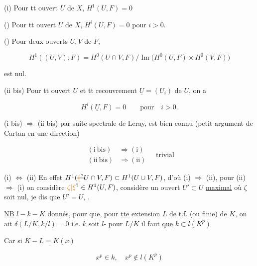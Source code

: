 (i) Pour tt ouvert $U$ de $X$, $H^1(U,F)=0$

() Pour tt ouvert $U$ de $X$, $H^i(U,F)=0$ pour $i>0$.

()  Pour deux ouverts $U,V$ de $F$,

\[
H^1((U,V);F)=H^0(U\cap V,F)/\operatorname{Im}\big(H^0(U,F)\times H^0(V,F)\big)
\]

est nul.

(ii bis) Pour tt ouvert $U$ et tt recouvrement  $\underline{U}=(U_i)$ de $U$, on a

\[
H^i(\underline{U},F)=0\qquad\text{pour}\quad i>0.
\]

(i bis) $\Longrightarrow$ (ii bis) par suite spectrale de Leray, est bien connu (petit argument de Cartan en une direction)

\[
\begin{aligned}
(\mathrm{i\ bis})&\Longrightarrow(\mathrm{i})\\[-2pt]
(\mathrm{ii\ bis})&\Longrightarrow(\mathrm{ii})
\end{aligned}
\quad\text{trivial}
\]

(i) $\Longleftrightarrow$ (ii) En effet $H^1(\deleted{\unsure{\{} }U\cap V,F)\subset H^1(U\cup V,F)$, d'où (i) $\Rightarrow$ (ii), pour (ii) $\Longrightarrow$ (i) on  considère $\unsure{\zeta|\xi}\in H^1(U,F)$,  considère un ouvert $U'\subset U$ \uline{maximal}  où $\zeta$ soit nul, je dis que $U'=U$, .

\uline{NB} $l-k-K$ donnés, pour que, pour \uline{tte} extension $L$ de t.f. (ou finie) de $K$, on ait  $\delta(L/K,k/l)=0$ i.e. $k$ soit $l$- pour $L/K$ il faut \uline{ que} $k\subset l(K^p)$ 

Car si $\underline{K-L=K(x)}$

\[
x^p\in k,\quad x^p\notin l(K^p)
\]



